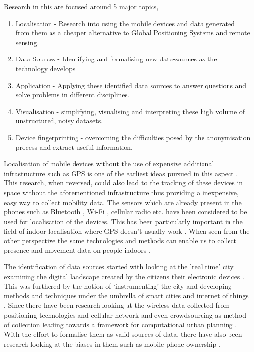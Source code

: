 Research in this are focused around 5 major topics,

\begin{enumerate}[rightmargin=2em, leftmargin=2em]
  \itemsep-0.25em
  \item Localisation - Research into using the mobile devices and data generated from them as a cheaper alternative to Global Positioning Systems and remote sensing.
  \item Data Sources - Identifying and formalising new data-sources as the technology develops
  \item Application - Applying these identified data sources to answer questions and solve problems in different disciplines.
  \item Visualisation - simplifying, visualising and interpreting these high volume of unstructured, noisy datasets.
  \item Device fingerprinting - overcoming the difficulties posed by the anonymisation process and extract useful information.
\end{enumerate}

Localisation of mobile devices without the use of expensive additional infrastructure such as GPS is one of the earliest ideas pursued in this aspect \citep{bulusu2000, he2003range, moore2004robust, lamarca2005place}. This research, when reversed, could also lead to the tracking of these devices in space without the aforementioned infrastructure thus providing a inexpensive, easy way to collect mobility data. The sensors which are already present in the phones such as Bluetooth \citep{bandara2004}, Wi-Fi \citep{zarim2006}, cellular radio \citep{dil2011, ahas2005} etc. have been considered to be used for localisation of the devices. This has been particularly important in the field of indoor localisation where GPS doesn't usually work \cite{kawaguchi2009wifi}. When seen from the other perspective the same technologies and methods can enable us to collect presence and movement data on people indoors \citep{roy2018smartphone, roy2018indoor, jia2019selecting, nikitin2019developing}.

The identification of data sources started with looking at the 'real time' city examining the digital landscape created by the citizens their electronic devices \citep{townsend2000}.
This was furthered by the notion of `instrumenting' the city and developing methods and techniques under the umbrella of smart cities and internet of things \citep{oneil2006}.
Since there have been research looking at the wireless data collected from positioning technologies \citep{bensky2007} and cellular network \citep{kiukkonen2010, steenbruggen2015} and even crowdsourcing as method of collection \citep{shin2013} leading towards a framework for computational urban planning \citep{kontokosta2015}.
With the effort to formalise them as valid sources of data, there have also been research looking at the biases in them such as mobile phone ownership \citep{wesolowski2013, kobus2013}.

